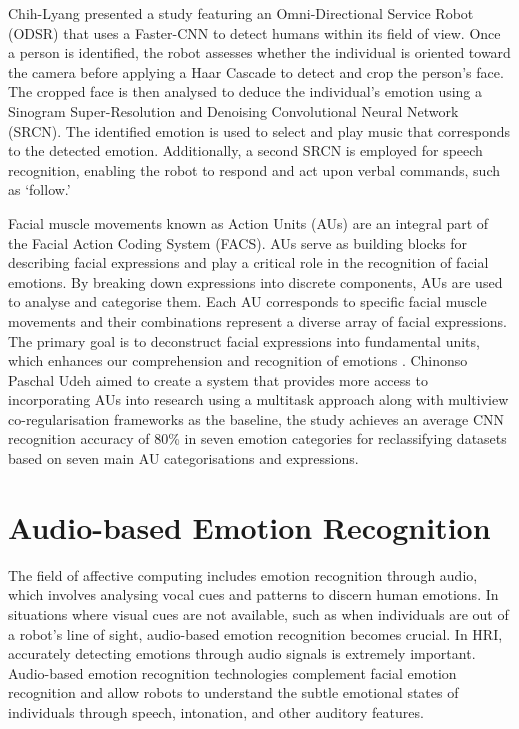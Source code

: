 Chih-Lyang \cite{9982640} presented a study featuring an Omni-Directional Service Robot (ODSR) that uses a Faster-CNN to detect humans within its field of view. Once a person is identified, the robot assesses whether the individual is oriented toward the camera before applying a Haar Cascade to detect and crop the person's face. The cropped face is then analysed to deduce the individual's emotion using a Sinogram Super-Resolution and Denoising Convolutional Neural Network (SRCN). The identified emotion is used to select and play music that corresponds to the detected emotion. Additionally, a second SRCN is employed for speech recognition, enabling the robot to respond and act upon verbal commands, such as `follow.'

Facial muscle movements known as Action Units (AUs) are an integral part of the Facial Action Coding System (FACS). AUs serve as building blocks for describing facial expressions and play a critical role in the recognition of facial emotions. By breaking down expressions into discrete components, AUs are used to analyse and categorise them. Each AU corresponds to specific facial muscle movements and their combinations represent a diverse array of facial expressions. The primary goal is to deconstruct facial expressions into fundamental units, which enhances our comprehension and recognition of emotions \cite{Mohammadpour2017-xk}. Chinonso Paschal Udeh \cite{Udeh2022-me} aimed to create a system that provides more access to incorporating AUs into research using a multitask approach along with multiview co-regularisation frameworks as the baseline, the study achieves an average CNN recognition accuracy of 80\% in seven emotion categories for reclassifying datasets based on seven main AU categorisations and expressions.

\section{Audio-based Emotion Recognition}

The field of affective computing includes emotion recognition through audio, which involves analysing vocal cues and patterns to discern human emotions. In situations where visual cues are not available, such as when individuals are out of a robot's line of sight, audio-based emotion recognition becomes crucial. In HRI, accurately detecting emotions through audio signals is extremely important. Audio-based emotion recognition technologies complement facial emotion recognition and allow robots to understand the subtle emotional states of individuals through speech, intonation, and other auditory features.

